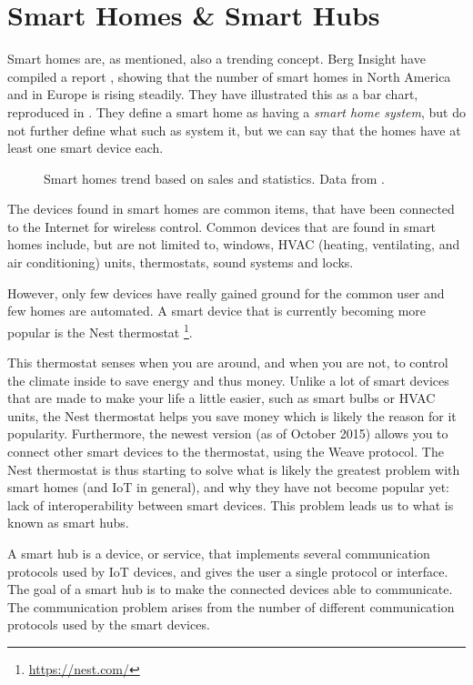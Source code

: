 \section{Smart Homes \& Smart Hubs}\label{sec:smarthomes}
Smart homes are, as mentioned, also a trending concept. 
Berg Insight have compiled a report \cite{SMARTHOMETREND}, 
showing that the number of smart homes in North America and in Europe is rising steadily. 
They have illustrated this as a bar chart, reproduced in .
They define a smart home as having a \emph{smart home system}, 
but do not further define what such as system it, 
but we can say that the homes have at least one smart device each. 

\begin{figure}[!htb]
  \centering
  
  \caption{Smart homes trend based on sales and statistics. Data from \protect\cite{SMARTHOMETREND}.}
  \label{fig:smarthomestrend}
\end{figure}


The devices found in smart homes are common items, 
that have been connected to the Internet for wireless control.
Common devices that are found in smart homes include, but are not limited to, 
windows, HVAC (heating, ventilating, and air conditioning) units, thermostats, sound systems and locks. 

However, only few devices have really gained ground for the common user and few homes are automated.
A smart device that is currently becoming more popular is the Nest thermostat \footnote{\url{https://nest.com/}}. 

This thermostat senses when you are around, and when you are not, 
to control the climate inside to save energy and thus money.
Unlike a lot of smart devices that are made to make your life a little easier, such as smart bulbs or HVAC units,
the Nest thermostat helps you save money which is likely the reason for it popularity. 
Furthermore, the newest version (as of October 2015) allows you to connect other smart devices to the thermostat, 
using the Weave protocol. 
The Nest thermostat is thus starting to solve what is likely the greatest problem with smart homes (and IoT in general), 
and why they have not become popular yet: lack of interoperability between smart devices. 
This problem leads us to what is known as smart hubs. 

A smart hub is a device, or service, that implements several communication protocols used by IoT devices, 
and gives the user a single protocol or interface. 
The goal of a smart hub is to make the connected devices able to communicate.
The communication problem arises from the number of different communication protocols used by the smart devices. 


